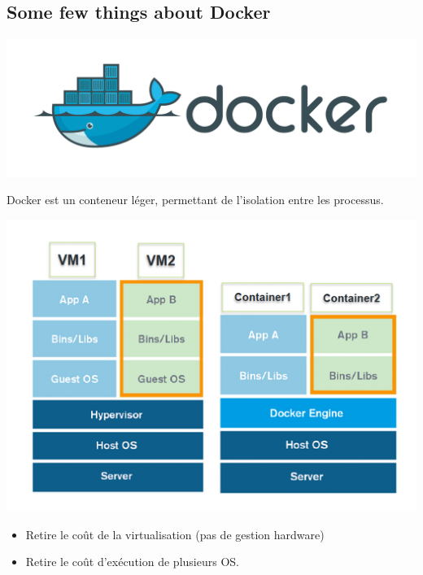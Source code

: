 \documentclass{bredelebeamer}
\begin{document}
\subsection{Some few things about Docker}
\begin{frame}
\begin{center}
\includegraphics[scale=0.3]{images/img5.png}
\end{center}
\end{frame}
\begin{frame}
Docker est un conteneur léger, permettant de l'isolation entre les processus.
\begin{center}
\includegraphics[scale=0.3]{images/img4.jpg}
\end{center}
\begin{itemize}
\item Retire le coût de la virtualisation (pas de gestion hardware)
\item Retire le coût d'exécution de plusieurs OS.
\end{itemize}

\end{frame}
\end{document}
